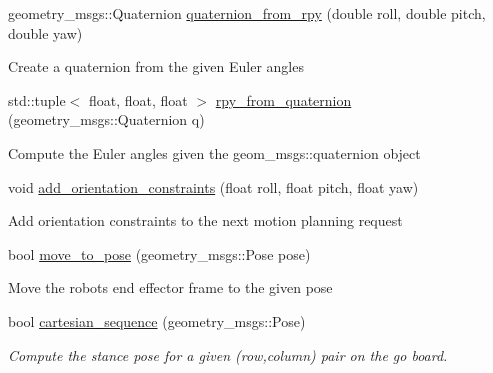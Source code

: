 \begin{DoxyCompactItemize}
geometry\+\_\+msgs\+::\+Quaternion \hyperlink{classgo__motion__planner_a60dfb0301a459aad73f0e597ef773ef3}{quaternion\+\_\+from\+\_\+rpy} (double roll, double pitch, double yaw)
\begin{DoxyCompactList}\small\item\em 
\begin{DoxyItemize}
\item Create a quaternion from the given Euler angles 
\end{DoxyItemize}\end{DoxyCompactList}\item 
std\+::tuple$<$ float, float, float $>$ \hyperlink{classgo__motion__planner_ab4b74ceb1ce2cab6859d8f7f0f32caa5}{rpy\+\_\+from\+\_\+quaternion} (geometry\+\_\+msgs\+::\+Quaternion q)
\begin{DoxyCompactList}\small\item\em 
\begin{DoxyItemize}
\item Compute the Euler angles given the geom\+\_\+msgs\+::quaternion object 
\end{DoxyItemize}\end{DoxyCompactList}\item 
void \hyperlink{classgo__motion__planner_a14a615472cc4daae8049627c4aacf1e2}{add\+\_\+orientation\+\_\+constraints} (float roll, float pitch, float yaw)
\begin{DoxyCompactList}\small\item\em 
\begin{DoxyItemize}
\item Add orientation constraints to the next motion planning request 
\end{DoxyItemize}\end{DoxyCompactList}\item 
bool \hyperlink{classgo__motion__planner_a2be951f1c56888d0e710290c884a6050}{move\+\_\+to\+\_\+pose} (geometry\+\_\+msgs\+::\+Pose pose)
\begin{DoxyCompactList}\small\item\em 
\begin{DoxyItemize}
\item Move the robot\textquotesingle{}s end effector frame to the given pose 
\end{DoxyItemize}\end{DoxyCompactList}\item 
bool \hyperlink{classgo__motion__planner_a0c8a279562b60fd12202452f09d5b149}{cartesian\+\_\+sequence} (geometry\+\_\+msgs\+::\+Pose)
\begin{DoxyCompactList}\small\item\em Compute the stance pose for a given (row,column) pair on the go board. \end{DoxyCompactList}\item 

\end{DoxyCompactItemize}
